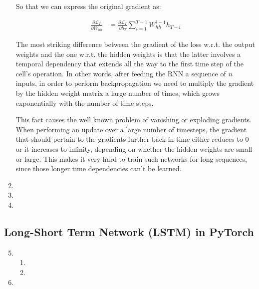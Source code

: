 \documentclass{article}
\newcommand{\del}[2]{\ensuremath{\frac{\partial #1}{\partial #2}}}
\newcommand{\Ell}{\ensuremath{\mathcal{L}}}
\begin{document}
\begin{enumerate}[label=\textbf{1.\arabic*}]
  So that we can express the original gradient as:

  \begin{align*}
    \del{\Ell_T}{W_{hh}} &= \del{\Ell_T}{h_T} \sum_{i=1}^{T-1} W_{hh}^{i-1} h_{T-i}
  \end{align*}

  The most striking difference between the gradient of the loss w.r.t. the output weights and the one w.r.t. the hidden weights is that the latter involves a temporal dependency that extends all the way to the first time step of the cell's operation. In other words, after feeding the RNN a sequence of $n$ inputs, in order to perform backpropagation we need to multiply the gradient by the hidden weight matrix a large number of times, which grows exponentially with the number of time steps.

  This fact causes the well known problem of vanishing or exploding gradients. When performing an update over a large number of timesteps, the gradient that should pertain to the gradients further back in time either reduces to $0$ or it increases to infinity, depending on whether the hidden weights are small or large. This makes it very hard to train such networks for long sequences, since those longer time dependencies can't be learned.

  \item
  \item
  \item
\end{enumerate}

\subsection{Long-Short Term Network (LSTM) in PyTorch}

\begin{enumerate}[label=\textbf{1.\arabic*}]
  \setcounter{enumi}{4}
  \item

  \begin{enumerate}[label=\textbf{(\alph*)}]
    \item
    \item
  \end{enumerate}

  \item
\end{enumerate}

\end{document}
